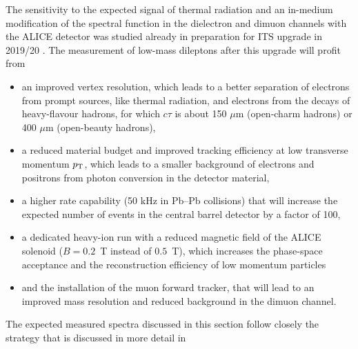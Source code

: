 \documentclass[../report.tex]{subfiles}
\begin{document}
The sensitivity to the expected signal of thermal radiation and an in-medium modification of the \Prho spectral function in the dielectron and dimuon channels with the ALICE detector \cite{generalALICEreferences} was studied already in preparation for ITS upgrade in 2019/20 \cite{Abelevetal:2014cna,Abelevetal:2014dna,ALICE:2014qrd,ALICE:MFTLoI}. The measurement of low-mass dileptons after this upgrade will profit from  
\begin{itemize}
\item an improved vertex resolution, which leads to a better separation of electrons from prompt sources, like thermal radiation, and electrons from the decays of heavy-flavour hadrons, for which $c\tau$ is about 150 $\mu$m (open-charm hadrons) or 400 $\mu$m (open-beauty hadrons), 
\item a reduced material budget and improved tracking efficiency at low transverse momentum $p_{\rm T}$, which leads to a smaller background of electrons and positrons from photon conversion in the detector material,
\item a higher rate capability (50 kHz in Pb--Pb collisions) that will increase the expected number of events in the central barrel detector by a factor of 100, 
\item a dedicated heavy-ion run with a reduced magnetic field of the ALICE solenoid ($B=0.2$~T instead of $0.5$~T), which increases the phase-space acceptance and the reconstruction efficiency of low momentum particles 
\item and the installation of the muon forward tracker, that will lead to an improved mass resolution and reduced background in the dimuon channel.
\end{itemize}
The expected measured spectra discussed in this section follow closely the strategy that is discussed in more detail in \cite{Abelevetal:2014cna,Abelevetal:2014dna,ALICE:2014qrd,ALICE:MFTLoI}
\end{document}
